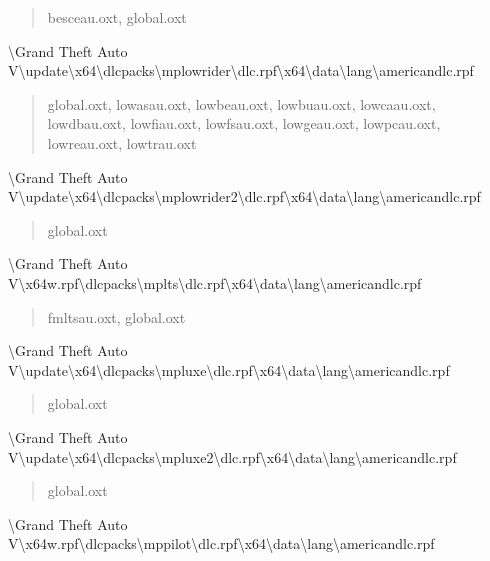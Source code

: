 \documentclass[]{scrartcl}
\begin{document}
\begin{quote}
   \ttfamily
   besceau.oxt, global.oxt
\end{quote}

\textbackslash{}Grand Theft Auto V\textbackslash{}update\textbackslash{}x64\textbackslash{}dlcpacks\textbackslash{}mplowrider\textbackslash{}dlc.rpf\textbackslash{}x64\textbackslash{}data\textbackslash{}lang\textbackslash{}americandlc.rpf

\begin{quote}
   \ttfamily
   global.oxt, lowasau.oxt, lowbeau.oxt, lowbuau.oxt, lowcaau.oxt, lowdbau.oxt, lowfiau.oxt, lowfsau.oxt, lowgeau.oxt, lowpcau.oxt, lowreau.oxt, lowtrau.oxt
\end{quote}

\textbackslash{}Grand Theft Auto V\textbackslash{}update\textbackslash{}x64\textbackslash{}dlcpacks\textbackslash{}mplowrider2\textbackslash{}dlc.rpf\textbackslash{}x64\textbackslash{}data\textbackslash{}lang\textbackslash{}americandlc.rpf

\begin{quote}
   \ttfamily
   global.oxt
\end{quote}

\textbackslash{}Grand Theft Auto V\textbackslash{}x64w.rpf\textbackslash{}dlcpacks\textbackslash{}mplts\textbackslash{}dlc.rpf\textbackslash{}x64\textbackslash{}data\textbackslash{}lang\textbackslash{}americandlc.rpf

\begin{quote}
   \ttfamily
   fmltsau.oxt, global.oxt
\end{quote}

\textbackslash{}Grand Theft Auto V\textbackslash{}update\textbackslash{}x64\textbackslash{}dlcpacks\textbackslash{}mpluxe\textbackslash{}dlc.rpf\textbackslash{}x64\textbackslash{}data\textbackslash{}lang\textbackslash{}americandlc.rpf

\begin{quote}
   \ttfamily
   global.oxt
\end{quote}

\textbackslash{}Grand Theft Auto V\textbackslash{}update\textbackslash{}x64\textbackslash{}dlcpacks\textbackslash{}mpluxe2\textbackslash{}dlc.rpf\textbackslash{}x64\textbackslash{}data\textbackslash{}lang\textbackslash{}americandlc.rpf

\begin{quote}
   \ttfamily
   global.oxt
\end{quote}

\textbackslash{}Grand Theft Auto V\textbackslash{}x64w.rpf\textbackslash{}dlcpacks\textbackslash{}mppilot\textbackslash{}dlc.rpf\textbackslash{}x64\textbackslash{}data\textbackslash{}lang\textbackslash{}americandlc.rpf
\end{document}
